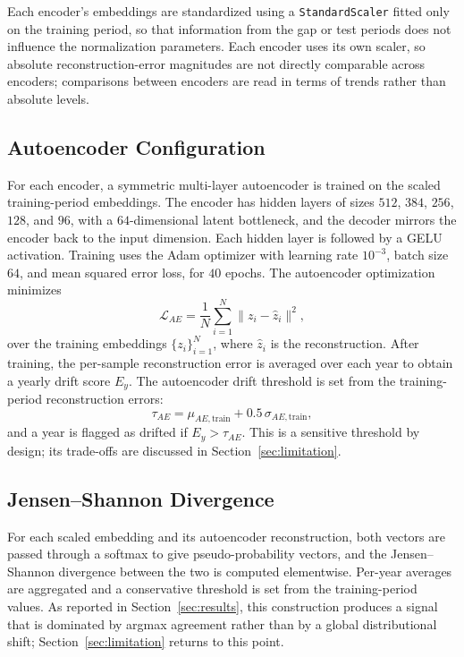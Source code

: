 \documentclass[conference]{IEEEtran}
\begin{document}
Each encoder's embeddings are standardized using a \texttt{StandardScaler} fitted only on the training period, so that information from the gap or test periods does not influence the normalization parameters. Each encoder uses its own scaler, so absolute reconstruction-error magnitudes are not directly comparable across encoders; comparisons between encoders are read in terms of trends rather than absolute levels.

\subsection{Autoencoder Configuration}

For each encoder, a symmetric multi-layer autoencoder is trained on the scaled training-period embeddings. The encoder has hidden layers of sizes $512$, $384$, $256$, $128$, and $96$, with a $64$-dimensional latent bottleneck, and the decoder mirrors the encoder back to the input dimension. Each hidden layer is followed by a GELU activation. Training uses the Adam optimizer \cite{kingma2015} with learning rate $10^{-3}$, batch size $64$, and mean squared error loss, for $40$ epochs. The autoencoder optimization minimizes
\begin{equation}
\mathcal{L}_{AE} = \frac{1}{N}\sum_{i=1}^{N} \|z_i - \hat{z}_i\|^2,
\end{equation}
over the training embeddings $\{z_i\}_{i=1}^{N}$, where $\hat{z}_i$ is the reconstruction. After training, the per-sample reconstruction error is averaged over each year to obtain a yearly drift score $E_y$. The autoencoder drift threshold is set from the training-period reconstruction errors:
\begin{equation}
\tau_{AE} = \mu_{AE,\text{train}} + 0.5\,\sigma_{AE,\text{train}},\label{eq:thresh}
\end{equation}
and a year is flagged as drifted if $E_y > \tau_{AE}$. This is a sensitive threshold by design; its trade-offs are discussed in Section~\ref{sec:limitation}.

\subsection{Jensen--Shannon Divergence}

For each scaled embedding and its autoencoder reconstruction, both vectors are passed through a softmax to give pseudo-probability vectors, and the Jensen--Shannon divergence between the two is computed elementwise. Per-year averages are aggregated and a conservative threshold is set from the training-period values. As reported in Section~\ref{sec:results}, this construction produces a signal that is dominated by argmax agreement rather than by a global distributional shift; Section~\ref{sec:limitation} returns to this point.
\end{document}
